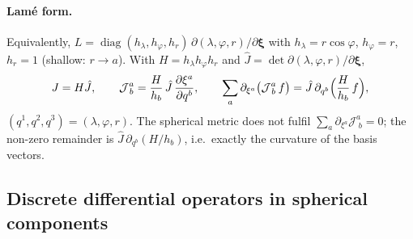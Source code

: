 \documentclass[11pt,a4paper]{article}
\newcommand{\Jm}{\mathcal{J}}
\begin{document}
\paragraph{Lam\'e form.}
Equivalently, $L = \operatorname{diag}(h_\lambda,h_\varphi,h_r)\,
\partial(\lambda,\varphi,r)/\partial\bm\xi$ with $h_\lambda = r\cos\varphi$,
$h_\varphi = r$, $h_r = 1$ (shallow: $r\to a$). With $H = h_\lambda h_\varphi h_r$
and $\hat J = \det\partial(\lambda,\varphi,r)/\partial\bm\xi$,
\begin{equation}
  J = H\hat J,\qquad
  \Jm^a_{\;b} = \frac{H}{h_b}\,\hat J\,\frac{\partial\xi^a}{\partial q^b},
  \qquad
  \sum_a\partial_{\xi^a}\bigl(\Jm^a_{\;b}\,f\bigr)
   = \hat J\,\partial_{q^b}\Bigl(\frac{H}{h_b}\,f\Bigr),
  \label{eq:metid}
\end{equation}
$(q^1,q^2,q^3) = (\lambda,\varphi,r)$. The spherical metric does not fulfil
$\sum_a\partial_{\xi^a}\Jm^a_{\;b} = 0$; the non-zero remainder is
$\hat J\,\partial_{q^b}(H/h_b)$, i.e.\ exactly the curvature of the basis
vectors.

\subsection{Discrete differential operators in spherical components}
\end{document}
